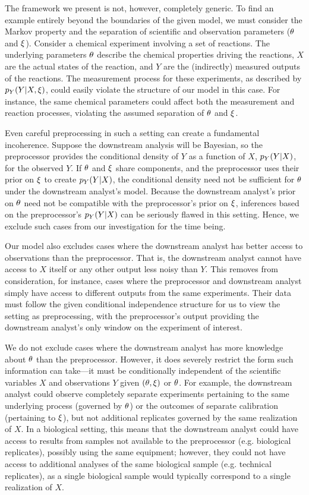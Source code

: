 The framework we present is not, however, completely generic.
To find an example entirely beyond the boundaries of the given model, we must consider the Markov property and the separation of scientific and observation parameters ($\theta$ and $\xi$).
Consider a chemical experiment involving a set of reactions.
The underlying parameters $\theta$ describe the chemical properties driving the reactions, $X$ are the actual states of the reaction, and $Y$ are the (indirectly) measured outputs of the reactions.
The measurement process for these experiments, as described by $p_Y(Y|X, \xi)$, could easily violate the structure of our model in this case.
For instance, the same chemical parameters could affect both the measurement and reaction processes, violating the assumed separation of $\theta$ and $\xi$.

Even careful preprocessing in such a setting can create a fundamental incoherence.
Suppose the downstream analysis will be Bayesian, so the preprocessor provides the conditional density of $Y$ as a function of $X$, $p_Y(Y | X)$,  for the observed $Y$.
If $\theta$ and $\xi$ share components, and the preprocessor uses their prior on $\xi$ to create $p_Y(Y | X)$, the conditional density need not be sufficient for $\theta$ under the downstream analyst's model.
Because the downstream analyst's prior on $\theta$ need not be compatible with the preprocessor's prior on $\xi$, inferences based on the preprocessor's $p_Y(Y | X)$ can be seriously flawed in this setting.
Hence, we exclude such cases from our investigation for the time being.

Our model also excludes cases where the downstream analyst has better access to observations than the preprocessor.
That is, the downstream analyst cannot have access to $X$ itself or any other output less noisy than $Y$.
This removes from consideration, for instance, cases where the preprocessor and downstream analyst simply have access to different outputs from the same experiments.
Their data must follow the given conditional independence structure for us to view the setting as preprocessing, with the preprocessor's output providing the downstream analyst's only window on the experiment of interest.

We do not exclude cases where the downstream analyst has more knowledge about $\theta$ than the preprocessor.
However, it does severely restrict the form such information can take---it must be conditionally independent of the scientific variables $X$ and observations $Y$ given $(\theta, \xi)$ or $\theta$.
For example, the downstream analyst could observe completely separate experiments pertaining to the same underlying process (governed by $\theta$) or the outcomes of separate calibration (pertaining to $\xi$), but not additional replicates governed by the same realization of $X$.
In a biological setting, this means that the downstream analyst could have access to results from samples not available to the preprocessor (e.g. biological replicates), possibly using the same equipment; however, they could not have access to additional analyses of the same biological sample (e.g. technical replicates), as a single biological sample would typically correspond to a single realization of $X$.


